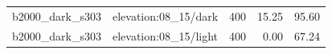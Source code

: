 \begin{longtable}{l>{\raggedright\arraybackslash}p{.42\linewidth}rrr}
b2000\_\allowbreak{}dark\_\allowbreak{}s303 & %
elevation:08\_\allowbreak{}15/dark & %
400 & %
15.25 & %
95.60 \\ %

b2000\_\allowbreak{}dark\_\allowbreak{}s303 & %
elevation:08\_\allowbreak{}15/light & %
400 & %
0.00 & %
67.24 \\ %


\end{longtable}
